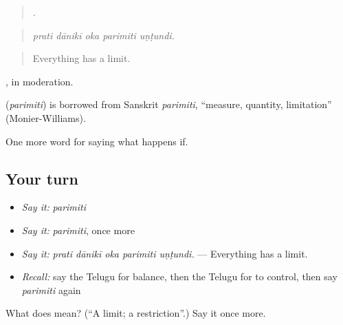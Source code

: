 \begin{quote}
    .
\end{quote}

\begin{quote}
\emph{prati dānikī oka parimiti uṇṭundi.}
\end{quote}

\begin{quote}
Everything has a limit.
\end{quote}

, in moderation.

\begin{cousinweb}
\textbf{} (\emph{parimiti}) is borrowed from Sanskrit \emph{parimiti}, \textquotedblleft{}measure, quantity, limitation\textquotedblright{} (Monier-Williams).
\end{cousinweb}

\begin{grammarlens}[title={What you've built}]
One more word for saying what happens if.
\end{grammarlens}

\subsection*{Your turn}
\begin{itemize}
\raggedright
  \item \emph{Say it:} \emph{parimiti}
  \item \emph{Say it:} \emph{parimiti}, once more
  \item \emph{Say it:} \emph{prati dānikī oka parimiti uṇṭundi.} — Everything has a limit.
  \item \emph{Recall:} say the Telugu for balance, then the Telugu for to control, then say \emph{parimiti} again
\end{itemize}

\begin{tcolorbox}[breakable,colback=teal!4,colframe=teal!35!black,title={Before you move on}]
What does  mean? (\textquotedblleft{}A limit; a restriction\textquotedblright{}.) Say it once more.
\end{tcolorbox}
